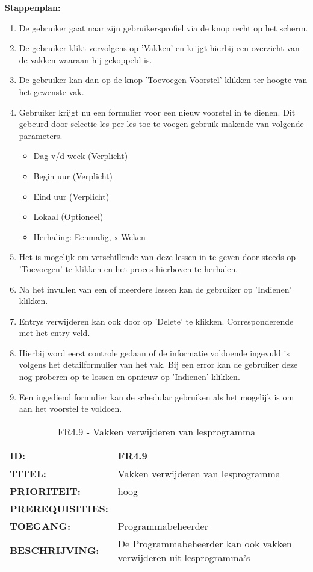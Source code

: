 \textbf{Stappenplan:}
	\begin{enumerate}
	\item De gebruiker gaat naar zijn gebruikersprofiel via de knop recht op het scherm.
	\item De gebruiker klikt vervolgens op 'Vakken' en krijgt hierbij een overzicht van de vakken waaraan hij gekoppeld is.
	\item De gebruiker kan dan op de knop 'Toevoegen Voorstel' klikken ter hoogte van het gewenste vak.
	\item Gebruiker krijgt nu een formulier voor een nieuw voorstel in te dienen. Dit gebeurd door selectie les per les toe te voegen gebruik makende van volgende parameters.
		\begin{itemize}
		\item Dag v/d week (Verplicht)
		\item Begin uur (Verplicht)
		\item Eind uur (Verplicht)
		\item Lokaal (Optioneel)
		\item Herhaling: Eenmalig, x Weken
		\end{itemize}
	\item Het is mogelijk om verschillende van deze lessen in te geven door steeds op 'Toevoegen' te klikken en het proces hierboven te herhalen.
	\item Na het invullen van een of meerdere lessen kan de gebruiker op 'Indienen' klikken.
	\item Entrys verwijderen kan ook door op 'Delete' te klikken. Corresponderende met het entry veld.
	\item Hierbij word eerst controle gedaan of de informatie voldoende ingevuld is volgens het detailformulier van het vak. Bij een error kan de gebruiker deze nog proberen op te lossen en opnieuw op 'Indienen' klikken.
	\item Een ingediend formulier kan de schedular gebruiken als het mogelijk is om aan het voorstel te voldoen.
	\end{enumerate}	        

\noindent\begin{table}[H]
            \begin{tabular}{l | p{10cm}}
                \textbf{ID:} & FR4.9 \\ \hline
                \textbf{TITEL:} & Vakken verwijderen van lesprogramma\\ \hline
                \textbf{PRIORITEIT:} &  hoog \\ \hline
                \textbf{PREREQUISITIES:} & \\ \hline
                \textbf{TOEGANG:} & Programmabeheerder \\ \hline
                \textbf{BESCHRIJVING:} & De Programmabeheerder kan ook vakken verwijderen uit lesprogramma’s \\ 
            \end{tabular}\\
            \caption{FR4.9 - Vakken verwijderen van lesprogramma}
            \label{tab:FR4.9 - Vakken verwijderen van lesprogramma}
        \end{table}    
        
